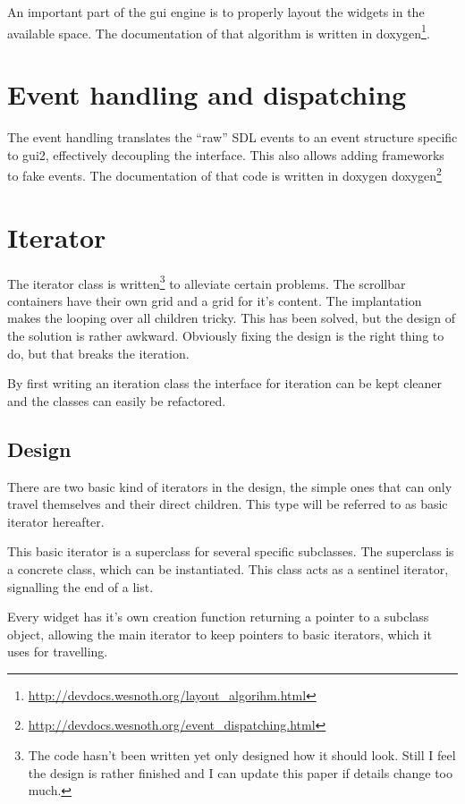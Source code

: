 \documentclass[a4paper,notitlepage,twocolumn,draft]{report}
\begin{document}
An important part of the gui engine is to properly layout the widgets in the
available space. The documentation of that algorithm is written in
doxygen\footnote{\url{http://devdocs.wesnoth.org/layout\_algorihm.html}}.

\section{Event handling and dispatching}
\label{event_handling}

The event handling translates the ``raw'' SDL events to an event structure
specific to gui2, effectively decoupling the interface. This also allows adding
frameworks to fake events. The documentation of that code is written in doxygen
doxygen\footnote{\url{http://devdocs.wesnoth.org/event_dispatching.html}}

\section{Iterator}

The iterator class is written\footnote{The code hasn't been written yet only
designed how it should look. Still I feel the design is rather finished and I
can update this paper if details change too much.} to alleviate certain
problems. The scrollbar containers have their own grid and a grid for it's
content. The implantation makes the looping over all children tricky. This has
been solved, but the design of the solution is rather awkward. Obviously fixing
the design is the right thing to do, but that breaks the iteration.

By first writing an iteration class the interface for iteration can be kept
cleaner and the classes can easily be refactored.

\subsection{Design}

There are two basic kind of iterators in the design, the simple ones that can
only travel themselves and their direct children. This type will be referred to
as basic iterator hereafter. 

This basic iterator is a superclass for several specific subclasses. The
superclass is a concrete class, which can be instantiated. This class acts as a
sentinel iterator, signalling the end of a list.

Every widget has it's own creation function returning a pointer to a subclass
object, allowing the main iterator to keep pointers to basic iterators, which it
uses for travelling.
\end{document}
